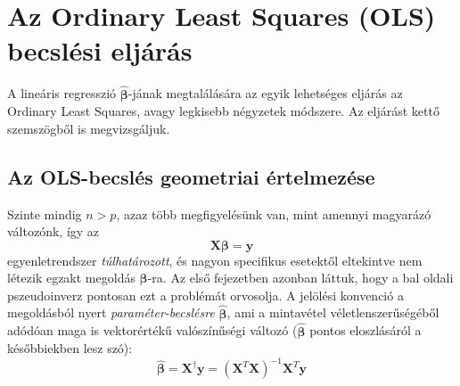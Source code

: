 \documentclass[14p]{report}
\def\pmb{\boldsymbol}
\def\ebeta{\hat{\pmb{\beta}}}
\newcounter{y}
\newcounter{z}
\begin{document}
	\section{Az Ordinary Least Squares (OLS) becslési eljárás}
	A lineáris regresszió $\ebeta$-jának megtalálására az egyik lehetséges eljárás az Ordinary Least Squares, avagy legkisebb négyzetek módszere. Az eljárást kettő szemszögből is megvizsgáljuk.
	
	\subsection{Az OLS-becslés geometriai értelmezése}
	Szinte mindig $n > p$, azaz több megfigyelésünk van, mint amennyi magyarázó változónk, így az
	\[
		\pmb{X}\pmb{\beta} = \pmb{y}
	\]
	 egyenletrendszer \emph{túlhatározott}, és nagyon specifikus esetektől eltekintve nem létezik egzakt megoldás $\pmb{\beta}$-ra. Az első fejezetben azonban láttuk, hogy a bal oldali pszeudoinverz pontosan ezt a problémát orvosolja. A jelölési konvenció a megoldásból nyert \emph{paraméter-becslésre} $\ebeta$, ami a mintavétel véletlenszerűségéből adódóan maga is vektorértékű valószínűségi változó ($\ebeta$ pontos eloszlásáról a későbbiekben lesz szó):
	\[
	\ebeta = \pmb{X}^{\dagger}\pmb{y} = (\pmb{X}^T\pmb{X})^{-1}\pmb{X}^T\pmb{y}
	\]
	
\end{document}
